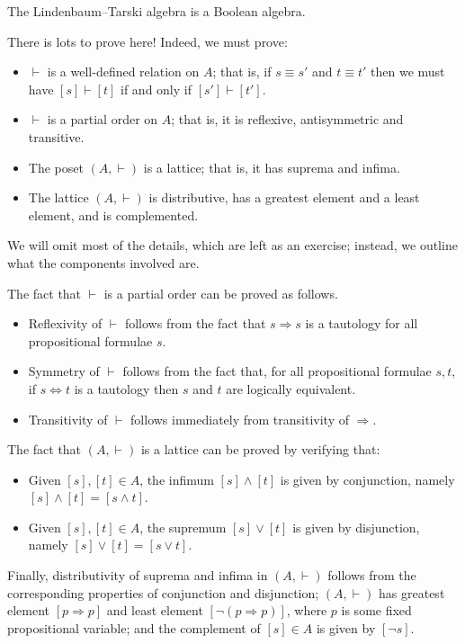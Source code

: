 \begin{theorem}
\label{thmLindenbaumTarskiIsBooleanAlgebra}
The Lindenbaum--Tarski algebra is a Boolean algebra.
\end{theorem}
\begin{cproof}
There is lots to prove here! Indeed, we must prove:
\begin{itemize}
\item $\vdash$ is a well-defined relation on $A$; that is, if $s \equiv s'$ and $t \equiv t'$ then we must have $[s] \vdash [t]$ if and only if $[s'] \vdash [t']$.
\item $\vdash$ is a partial order on $A$; that is, it is reflexive, antisymmetric and transitive.
\item The poset $(A, \vdash)$ is a lattice; that is, it has suprema and infima.
\item The lattice $(A, \vdash)$ is distributive, has a greatest element and a least element, and is complemented.
\end{itemize}
We will omit most of the details, which are left as an exercise; instead, we outline what the components involved are.

The fact that $\vdash$ is a partial order can be proved as follows.
\begin{itemize}
\item Reflexivity of $\vdash$ follows from the fact that $s \Rightarrow s$ is a tautology for all propositional formulae $s$.
\item Symmetry of $\vdash$ follows from the fact that, for all propositional formulae $s,t$, if $s \Leftrightarrow t$ is a tautology then $s$ and $t$ are logically equivalent.
\item Transitivity of $\vdash$ follows immediately from transitivity of $\Rightarrow$.
\end{itemize}

The fact that $(A, \vdash)$ is a lattice can be proved by verifying that:
\begin{itemize}
\item Given $[s],[t] \in A$, the infimum $[s] \wedge [t]$ is given by conjunction, namely $[s] \wedge [t] = [s \wedge t]$.
\item Given $[s],[t] \in A$, the supremum $[s] \vee [t]$ is given by disjunction, namely $[s] \vee [t] = [s \vee t]$.
\end{itemize}

Finally, distributivity of suprema and infima in $(A, \vdash)$ follows from the corresponding properties of conjunction and disjunction; $(A, \vdash)$ has greatest element $[p \Rightarrow p]$ and least element $[\neg(p \Rightarrow p)]$, where $p$ is some fixed propositional variable; and the complement of $[s] \in A$ is given by $[\neg s]$.
\end{cproof}

